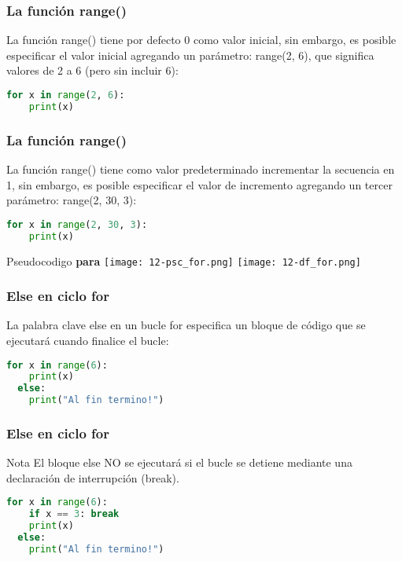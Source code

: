 \begin{frame}[fragile]
  \frametitle{La función \textbf{range}()}

  La función \textcolor{codeKeyword2}{range}() tiene por defecto 0
  como valor inicial, sin embargo, es posible especificar el valor
  inicial agregando un parámetro: \textcolor{codeKeyword2}{range}(2, 6),
  que significa valores de 2 a 6 (pero sin incluir 6):

  \vspace{\baselineskip}
  \begin{lstlisting}[language=Python]
  for x in range(2, 6):
    print(x)
  \end{lstlisting}
\end{frame}

\begin{frame}[fragile]
  \frametitle{La función \textbf{range}()}

  La función \textcolor{codeKeyword2}{range}() tiene como valor
  predeterminado incrementar la secuencia en 1, sin embargo, es
  posible especificar el valor de incremento agregando un tercer
  parámetro: \textcolor{codeKeyword2}{range}(2, 30, 3):

  \vspace{\baselineskip}
  \begin{lstlisting}[language=Python]
  for x in range(2, 30, 3):
    print(x)
  \end{lstlisting}
\end{frame}

\begin{frame}[c]{Pseudocodigo \textbf{para}}
  \texttt{[image: 12-psc\_for.png]}
  \pausa
  \texttt{[image: 12-df\_for.png]}
\end{frame}

\begin{frame}[fragile]
  \frametitle{\textbf{Else} en ciclo \textbf{for}}

  La palabra clave \textcolor{codeKeyword2}{else} en un bucle for
  especifica un bloque de código que se ejecutará cuando
  finalice el bucle:

  \vspace{\baselineskip}
  \begin{lstlisting}[language=Python]
  for x in range(6):
    print(x)
  else:
    print("Al fin termino!")
  \end{lstlisting}
\end{frame}

\begin{frame}[fragile]
  \frametitle{\textbf{Else} en ciclo \textbf{for}}

  \begin{alertblock}{Nota}
    El bloque else NO se ejecutará si el bucle se detiene
    mediante una declaración de interrupción (break).
  \end{alertblock}

  \vspace{\baselineskip}
  \begin{lstlisting}[language=Python]
  for x in range(6):
    if x == 3: break
    print(x)
  else:
    print("Al fin termino!")
  \end{lstlisting}
\end{frame}

